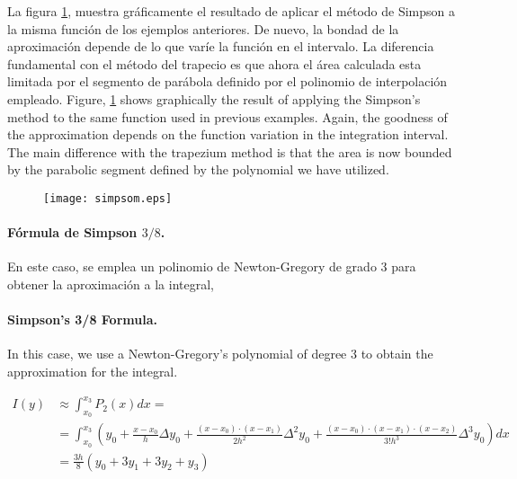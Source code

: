 \begin{paracol}{2}
La figura \ref{fig:simpsom}, muestra gráficamente el resultado de aplicar el método de Simpson a la misma función de los ejemplos anteriores.  De nuevo, la bondad de la aproximación depende de lo que varíe la función en el intervalo.  La diferencia fundamental con el método del trapecio es que ahora el área calculada esta limitada por el segmento de parábola definido por el polinomio de interpolación empleado.
\switchcolumn
Figure, \ref{fig:simpsom} shows graphically the result of applying the Simpson's method to the same function used in previous examples. Again, the goodness of the approximation depends on the function variation in the integration interval. The main difference with the trapezium method is that the area is now bounded by the parabolic segment defined by the polynomial we have utilized.   
\end{paracol}
\begin{figure}[h]
\centering
\texttt{[image: simpsom.eps]}
\label{fig:simpsom}
\end{figure}

\begin{paracol}{2}
\paragraph*{Fórmula de Simpson $3/8$.} En este caso, se emplea un polinomio de Newton-Gregory de grado 3 para obtener la aproximación a la integral,
\switchcolumn
\paragraph{Simpson's 3/8 Formula.} In this case, we use a Newton-Gregory's polynomial of degree 3 to obtain the approximation for the integral. 
\end{paracol}
\begin{align*}
I(y)&\approx \int_{x_0}^{x_3}P_2(x)dx=\\
&=\int_{x_0}^{x_3}\left(y_0+\frac{x-x_0}{h}\Delta y_0+\frac{(x-x_0)\cdot(x-x_1)}{2h^2}\Delta^2 y_0 +\frac{(x-x_0)\cdot(x-x_1)\cdot (x-x_2)}{3!h^3}\Delta^3 y_0\right)dx\\
&= \frac{3h}{8}(y_0+3y_1+3y_2+y_3)
\end{align*}

